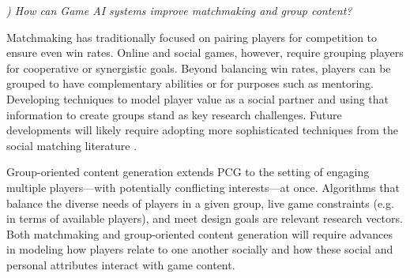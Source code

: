 \documentclass[conference]{IEEEtran}
\newcounter{questionno}
\newcommand{\subsubsectionx}[1]{{\em {\arabic{questionno}) #1}}
	\addtocounter{questionno}{1}
	}
\begin{document}
\subsubsectionx{How can Game AI systems improve matchmaking and group content?}
%
Matchmaking has traditionally focused on pairing players for competition to ensure even win rates.
Online and social games, however, require grouping players for cooperative or synergistic goals. 
Beyond balancing win rates, players can be grouped to have complementary abilities or for purposes such as mentoring. 
Developing techniques to model player value as a social partner and using that information to create groups stand as key research challenges. 
Future developments will likely require adopting more sophisticated techniques from the social matching literature \cite{terveen2005:social-matching}. 

Group-oriented content generation extends PCG to the setting of engaging multiple players---with potentially conflicting interests---at once.
Algorithms that balance the diverse needs of players in a given group, live game constraints (e.g. in terms of available players), and meet design goals are relevant research vectors.
Both matchmaking and group-oriented content generation will require advances in modeling how players relate to one another socially and how these social and personal attributes interact with game content. 
\end{document}
